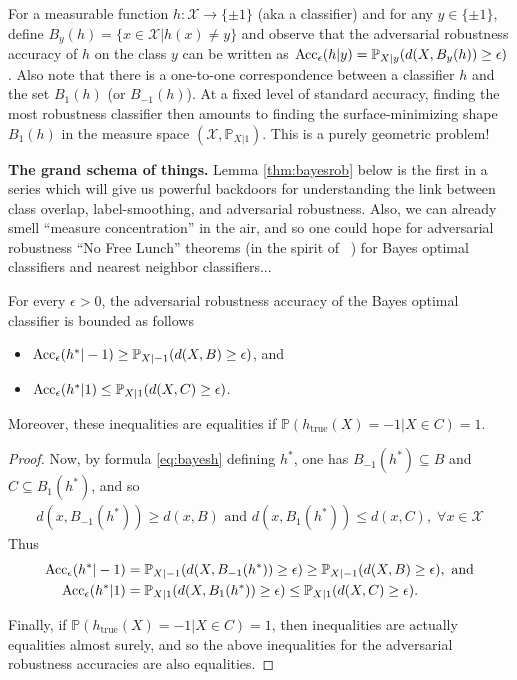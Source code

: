 For a measurable function $h:\mathcal X \rightarrow \{\pm 1\}$ (aka a classifier)
and for any $y \in \{\pm 1\}$, define $B_y(h) = \{x \in \mathcal X | h(x) \ne
y\}$ and observe that the adversarial robustness accuracy of $h$ on the class
$y$ can be written as $\operatorname{Acc}_\epsilon(h|y)=\mathbb P_{X|y}(d(X,B_y(h)) \ge
\epsilon)$. Also note that there is a one-to-one correspondence between a
classifier $h$ and the set $B_1(h)$ (or $B_{-1}(h)$). At a fixed level of
standard accuracy, finding the most robustness classifier then amounts to
finding the surface-minimizing shape $B_1(h)$ in the measure space $(\mathcal X,
\mathbb P_{X|1})$. This is a purely geometric problem!
\begin{mdframed}
  \textbf{The grand schema of things.}
  Lemma \ref{thm:bayesrob} below is the first in a series which will give us
  powerful backdoors for understanding the link between class overlap,
  label-smoothing, and adversarial robustness. Also, we can already smell
  ``measure concentration'' in the air, and so one could hope for adversarial
  robustness ``No Free Lunch'' theorems (in the spirit of
  ~\citep{dohmatob2018limitations}) for Bayes optimal classifiers and nearest
  neighbor classifiers...
\end{mdframed}


\begin{lemma}
For every $\epsilon > 0$, the adversarial robustness accuracy of the Bayes
optimal classifier is bounded as follows
\begin{itemize}
\item $\operatorname{Acc}_\epsilon(h^*|-1) \ge \mathbb P_{X|-1}(d(X,B)\ge \epsilon)$, and
\item $\operatorname{Acc}_\epsilon(h^*|1) \le \mathbb P_{X|1}(d(X,C)\ge \epsilon)$.
\end{itemize}
Moreover, these inequalities are equalities if $\mathbb P(h_{\text{true}}(X)=-1|X
\in C)=1$.
\label{thm:bayesrob}
\end{lemma}
\begin{proof}
  Now, by
  formula \eqref{eq:bayesh} defining $h^*$, one has $B_{-1}(h^*) \subseteq B$
  and $C \subseteq B_1(h^*)$, and so
  \begin{eqnarray}
    d(x,B_{-1}(h^*)) \ge d(x,B)\text{ and }d(x,B_1(h^*)) \le d(x,C),\;\forall x
    \in \mathcal X
  \label{eq:dist}
  \end{eqnarray}
  Thus
  \begin{eqnarray*}
    \begin{split}
    \operatorname{Acc}_\epsilon(h^*|-1)&=\mathbb P_{X|-1}(d(X,B_{-1}(h^*)) \ge \epsilon) \ge
    \mathbb P_{X|-1}(d(X,B)\ge \epsilon),\text{ and}\\
    \operatorname{Acc}_\epsilon(h^*|1)&=\mathbb P_{X|1}(d(X,B_{1}(h^*)) \ge \epsilon) \le
    \mathbb P_{X|1}(d(X,C)\ge \epsilon).
    \end{split}
  \end{eqnarray*}

  Finally, if $\mathbb P(h_{\text{true}}(X)=-1|X \in C)=1$, then inequalities
  are actually equalities almost surely, and so the above inequalities for the
  adversarial robustness accuracies are also equalities.
\end{proof}

